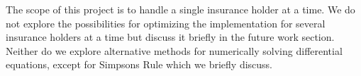 
The scope of this project is to handle a single insurance holder at a time. We do not explore the possibilities for optimizing the implementation for several insurance holders at a time but discuss it briefly in the future work section. Neither do we explore alternative methods for numerically solving differential equations, except for Simpsons Rule which we briefly discuss.